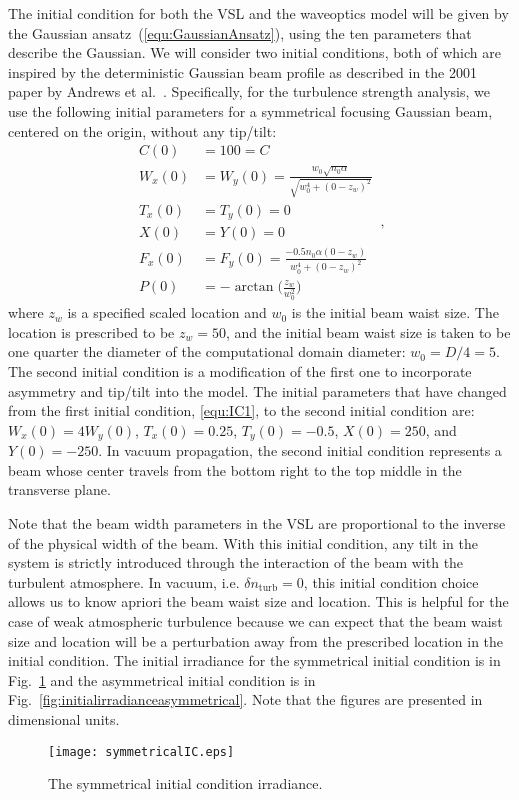 \documentclass[9pt,twocolumn,twoside]{osajnl}
\newcommand{\la}[1]{\label{#1}}
\begin{document}
The initial condition for both the VSL and the waveoptics model will be given by the Gaussian ansatz~(\ref{equ:GaussianAnsatz}), using the ten parameters that describe the Gaussian.  
We will consider two initial conditions, both of which are inspired by the deterministic Gaussian beam profile as described in the 2001 paper by Andrews et al.~\cite{andrews2001theory}.  
Specifically, for the turbulence strength analysis, we use the following initial parameters for a symmetrical focusing Gaussian beam, centered on the origin, without any tip/tilt:
\begin{equation} 
\la{equ:IC1}
	\begin{split}
		C(0) & = 100 = C \\
		W_x(0) & = W_y(0)=  \frac{w_0 \sqrt{n_0 \alpha}}{\sqrt{w_0^4 + (0 - z_w)^2}} \\
		T_x(0) & = T_y(0) = 0 \\
		X(0) & = Y(0) = 0 \\
		F_x(0) & = F_y(0) =  \frac{-0.5 n_0 \alpha(0 - z_w)}{w_0^4 + (0 - z_w)^2} \\
		P(0) & = -\arctan\Big(\frac{z_{w}}{w_0^2}\Big)
	\end{split} \, ,
\end{equation}
where $z_{w}$ is a specified scaled location and $w_{0}$ is the initial beam waist size. 
The location is prescribed to be $z_{w} = 50$, and the initial beam waist size is taken to be one quarter the diameter of the computational domain diameter: $w_{0} = D / 4 = 5$. 
The second initial condition is a modification of the first one to incorporate asymmetry and tip/tilt into the model. 
The initial parameters that have changed from the first initial condition, \eqref{equ:IC1}, to the second initial condition are: $W_x(0) = 4W_y(0)$, $T_{x}(0) = 0.25$, $T_{y}(0) = -0.5$, $X(0) = 250$, and $Y(0) = -250$.  In vacuum propagation, the second initial condition represents a beam whose center travels from the bottom right to the top middle in the transverse plane.

Note that the beam width parameters in the VSL are proportional to the inverse of the physical width of the beam. 
With this initial condition, any tilt in the system is strictly introduced through the interaction of the beam with 
the turbulent atmosphere. In vacuum, i.e. $\delta n_\text{turb} = 0$, this initial condition choice allows us to know 
apriori the beam waist size and location. This is helpful for the case of weak atmospheric turbulence because we can 
expect that the beam waist size and location will be a perturbation away from the prescribed location in the initial 
condition. The initial irradiance for the symmetrical initial condition is in Fig.~\ref{fig:initialirradiancesymmetrical} 
and the asymmetrical initial condition is in Fig.~\ref{fig:initialirradianceasymmetrical}. Note that the figures are
presented in dimensional units. 
\begin{figure}[t!]
	\centering
	\texttt{[image: symmetricalIC.eps]}
	\caption{The symmetrical initial condition irradiance.} \label{fig:initialirradiancesymmetrical} \vspace*{-3mm}
\end{figure}
\end{document}
